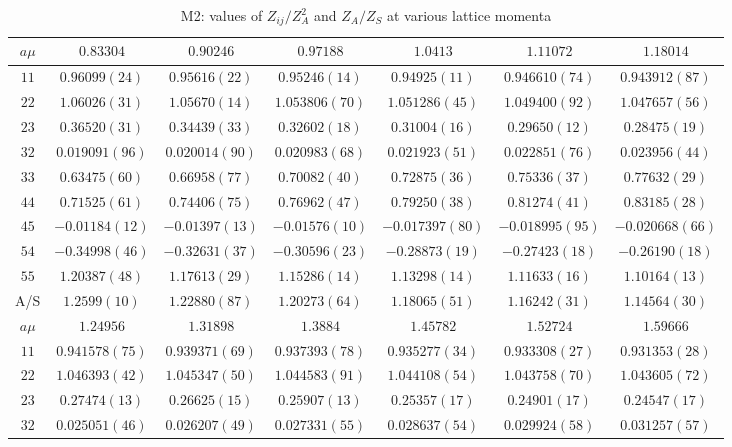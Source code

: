 \begin{table}
\begin{center}
\caption{M2: values of $Z_{ij}/Z_A^2$ and $Z_A/Z_S$ at various lattice momenta}
\begin{tabular}{c|c c c c c c}
\hline
\hline
$a\mu$ & $0.83304$ & $0.90246$ & $0.97188$ & $1.0413$ & $1.11072$ & $1.18014$ \\
\hline
$11$ & $0.96099(24)$ & $0.95616(22)$ & $0.95246(14)$ & $0.94925(11)$ & $0.946610(74)$ & $0.943912(87)$ \\
$22$ & $1.06026(31)$ & $1.05670(14)$ & $1.053806(70)$ & $1.051286(45)$ & $1.049400(92)$ & $1.047657(56)$ \\
$23$ & $0.36520(31)$ & $0.34439(33)$ & $0.32602(18)$ & $0.31004(16)$ & $0.29650(12)$ & $0.28475(19)$ \\
$32$ & $0.019091(96)$ & $0.020014(90)$ & $0.020983(68)$ & $0.021923(51)$ & $0.022851(76)$ & $0.023956(44)$ \\
$33$ & $0.63475(60)$ & $0.66958(77)$ & $0.70082(40)$ & $0.72875(36)$ & $0.75336(37)$ & $0.77632(29)$ \\
$44$ & $0.71525(61)$ & $0.74406(75)$ & $0.76962(47)$ & $0.79250(38)$ & $0.81274(41)$ & $0.83185(28)$ \\
$45$ & $-0.01184(12)$ & $-0.01397(13)$ & $-0.01576(10)$ & $-0.017397(80)$ & $-0.018995(95)$ & $-0.020668(66)$ \\
$54$ & $-0.34998(46)$ & $-0.32631(37)$ & $-0.30596(23)$ & $-0.28873(19)$ & $-0.27423(18)$ & $-0.26190(18)$ \\
$55$ & $1.20387(48)$ & $1.17613(29)$ & $1.15286(14)$ & $1.13298(14)$ & $1.11633(16)$ & $1.10164(13)$ \\
\hline
A/S & $1.2599(10)$ & $1.22880(87)$ & $1.20273(64)$ & $1.18065(51)$ & $1.16242(31)$ & $1.14564(30)$ \\
\hline
$a\mu$ & $1.24956$ & $1.31898$ & $1.3884$ & $1.45782$ & $1.52724$ & $1.59666$ \\
\hline
$11$ & $0.941578(75)$ & $0.939371(69)$ & $0.937393(78)$ & $0.935277(34)$ & $0.933308(27)$ & $0.931353(28)$ \\
$22$ & $1.046393(42)$ & $1.045347(50)$ & $1.044583(91)$ & $1.044108(54)$ & $1.043758(70)$ & $1.043605(72)$ \\
$23$ & $0.27474(13)$ & $0.26625(15)$ & $0.25907(13)$ & $0.25357(17)$ & $0.24901(17)$ & $0.24547(17)$ \\
$32$ & $0.025051(46)$ & $0.026207(49)$ & $0.027331(55)$ & $0.028637(54)$ & $0.029924(58)$ & $0.031257(57)$ \\

\end{tabular}
\end{center}
\end{table}
